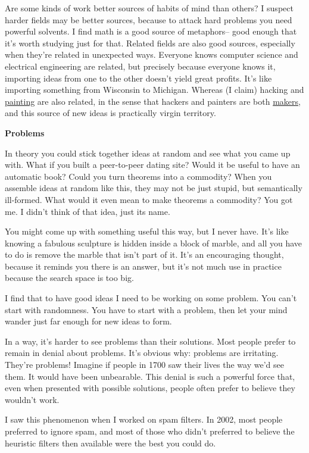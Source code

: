 \documentclass[12pt]{book}
\begin{document}
Are some kinds of work better sources of habits of mind than others? I
suspect harder fields may be better sources, because to attack hard
problems you need powerful solvents. I find math is a good source of
metaphors-- good enough that it's worth studying just for that. Related
fields are also good sources, especially when they're related in
unexpected ways. Everyone knows computer science and electrical
engineering are related, but precisely because everyone knows it,
importing ideas from one to the other doesn't yield great profits. It's
like importing something from Wisconsin to Michigan. Whereas (I claim)
hacking and \href{hp.html}{painting} are also related, in the sense that
hackers and painters are both \href{taste.html}{makers}, and this source
of new ideas is practically virgin territory.

\textbf{Problems}

In theory you could stick together ideas at random and see what you came
up with. What if you built a peer-to-peer dating site? Would it be
useful to have an automatic book? Could you turn theorems into a
commodity? When you assemble ideas at random like this, they may not be
just stupid, but semantically ill-formed. What would it even mean to
make theorems a commodity? You got me. I didn't think of that idea, just
its name.

You might come up with something useful this way, but I never have. It's
like knowing a fabulous sculpture is hidden inside a block of marble,
and all you have to do is remove the marble that isn't part of it. It's
an encouraging thought, because it reminds you there is an answer, but
it's not much use in practice because the search space is too big.

I find that to have good ideas I need to be working on some problem. You
can't start with randomness. You have to start with a problem, then let
your mind wander just far enough for new ideas to form.

In a way, it's harder to see problems than their solutions. Most people
prefer to remain in denial about problems. It's obvious why: problems
are irritating. They're problems! Imagine if people in 1700 saw their
lives the way we'd see them. It would have been unbearable. This denial
is such a powerful force that, even when presented with possible
solutions, people often prefer to believe they wouldn't work.

I saw this phenomenon when I worked on spam filters. In 2002, most
people preferred to ignore spam, and most of those who didn't preferred
to believe the heuristic filters then available were the best you could
do.
\end{document}
